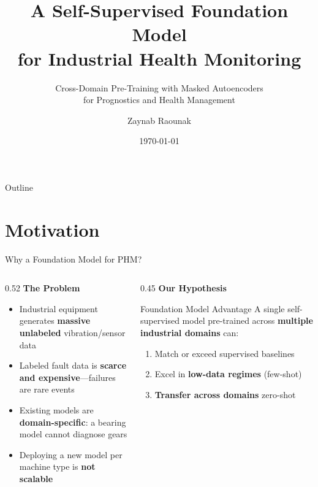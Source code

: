 \documentclass[aspectratio=169, 11pt]{beamer}
\title[Foundation Model for PHM]{A Self-Supervised Foundation Model\\for Industrial Health Monitoring}
\subtitle{Cross-Domain Pre-Training with Masked Autoencoders\\for Prognostics and Health Management}
\author{Zaynab Raounak}
\date{\today}
\begin{document}
\begin{frame}
\titlepage
\end{frame}

\begin{frame}{Outline}
\tableofcontents
\end{frame}

\section{Motivation}

\begin{frame}{Why a Foundation Model for PHM?}
\begin{columns}[T]
\begin{column}{0.52\textwidth}
\textbf{The Problem}
\begin{itemize}
    \item Industrial equipment generates \textbf{massive unlabeled} vibration/sensor data
    \item Labeled fault data is \textbf{scarce and expensive}---failures are rare events
    \item Existing models are \textbf{domain-specific}: a bearing model cannot diagnose gears
    \item Deploying a new model per machine type is \textbf{not scalable}
\end{itemize}
\end{column}
\begin{column}{0.45\textwidth}
\textbf{Our Hypothesis}
\begin{block}{Foundation Model Advantage}
A single self-supervised model pre-trained across \textbf{multiple industrial domains} can:
\begin{enumerate}
    \item Match or exceed supervised baselines
    \item Excel in \textbf{low-data regimes} (few-shot)
    \item \textbf{Transfer across domains} zero-shot
\end{enumerate}
\end{block}
\end{column}
\end{columns}
\end{frame}
\end{document}
